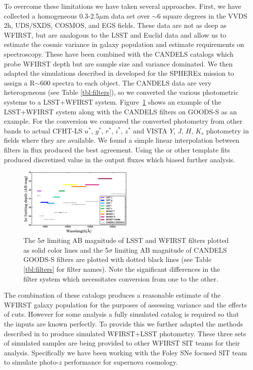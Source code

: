 To overcome these limitations we have taken several approaches.  First, we have
collected a homogeneous 0.3-2.5$\mu$m data set over $\sim6$ square degrees in
the VVDS 2h, UDS/SXDS, COSMOS, and EGS fields.  These data are not as deep as
WFIRST, but are analogous to the LSST and Euclid data and allow us to estimate
the cosmic variance in galaxy population and estimate requirements on
spectroscopy.  These have been combined with the CANDELS catalogs which probe
WFIRST depth but are sample size and variance dominated.  We then adapted the
simulations described in \citet{stickley2016} developed for the SPHEREx mission
to assign a R$\sim$600 spectra to each object.  The CANDELS data are very
heterogeneous (see Table \ref{tbl:filters}), so we converted the various
photometric systems to a LSST+WFIRST system.  Figure~\ref{fig:filters} shows an
example of the LSST+WFIRST system along with the CANDELS filters on GOODS-S as
an example.  For the conversion we compared the converted photometry from other
bands to actual CFHT-LS $u^*$, $g^*$, $r^*$, $i^*$, $z^*$ and VISTA $Y$, $J$,
$H$, $K_s$ photometry in fields where they are available.   We found a simple
linear interpolation between filters in flux produced the best agreement.  Using
the \citet{stickley2016} or other template fits produced discretized value  in
the output fluxes which biased further analysis.

\begin{figure}
\centering
  \includegraphics[trim=0cm 0cm 0cm 0cm, clip,width=0.50\textwidth] {./plots/filters.eps}
\caption{The 5$\sigma$ limiting AB magnitude of LSST and WFIRST filters plotted
as solid color lines and the 5$\sigma$ limiting AB magnitude of CANDELS GOODS-S
filters are plotted with dotted black lines (see Table \ref{tbl:filters} for
filter names).  Note the significant differences in the filter system which
necessitates conversion from one to the other.}
\label{fig:filters}
\end{figure}

The combination of these catalogs produces a reasonable estimate of the WFIRST
galaxy population for the purposes of assessing variance and the effects of
cuts.  However for some analysis a fully simulated catalog is required so that
the inputs are known perfectly.  To provide this we further adapted the methods
described in \citet{stickley2016} to produce simulated WFIRST+LSST photometry.
These three sets of simulated samples are being provided to other WFIRST SIT
teams for their analysis. Specifically we have been working with the Foley SNe focused SIT
team to simulate photo-$z$ performance for supernova cosmology.

